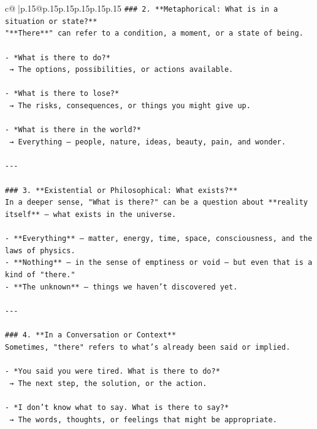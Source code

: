 \documentclass{article}
\begin{document}
{\begin{supertabular}{c@{$\;$}|p{.15\linewidth}@{}p{.15\linewidth}p{.15\linewidth}p{.15\linewidth}p{.15\linewidth}p{.15\linewidth}}
{{{\texttt{\#\#\# 2. **Metaphorical: What is in a situation or state?**} \\
\texttt{"**There**" can refer to a condition, a moment, or a state of being.} \\
\\ 
\texttt{{-} *What is there to do?*  } \\
\texttt{  → The options, possibilities, or actions available.} \\
\\ 
\texttt{{-} *What is there to lose?*  } \\
\texttt{  → The risks, consequences, or things you might give up.} \\
\\ 
\texttt{{-} *What is there in the world?*  } \\
\texttt{  → Everything — people, nature, ideas, beauty, pain, and wonder.} \\
\\ 
\texttt{{-}{-}{-}} \\
\\ 
\texttt{\#\#\# 3. **Existential or Philosophical: What exists?**} \\
\texttt{In a deeper sense, "What is there?" can be a question about **reality itself** — what exists in the universe.} \\
\\ 
\texttt{{-} **Everything** — matter, energy, time, space, consciousness, and the laws of physics.} \\
\texttt{{-} **Nothing** — in the sense of emptiness or void — but even that is a kind of "there."} \\
\texttt{{-} **The unknown** — things we haven’t discovered yet.} \\
\\ 
\texttt{{-}{-}{-}} \\
\\ 
\texttt{\#\#\# 4. **In a Conversation or Context**} \\
\texttt{Sometimes, "there" refers to what’s already been said or implied.} \\
\\ 
\texttt{{-} *You said you were tired. What is there to do?*  } \\
\texttt{  → The next step, the solution, or the action.} \\
\\ 
\texttt{{-} *I don’t know what to say. What is there to say?*  } \\
\texttt{  → The words, thoughts, or feelings that might be appropriate.} \\
}}}
\end{supertabular}}
\end{document}
